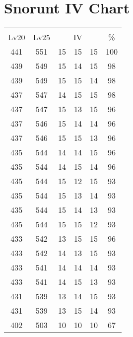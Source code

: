 \documentclass{article}%
\begin{document}
%
\normalsize%
\section{Snorunt IV Chart}%
\label{sec:Snorunt IV Chart}%
\renewcommand{\arraystretch}{1.5}%
\begin{tabular}{|c|c|c|c|c|c|}%
\hline%
\multicolumn{6}{|c|}{\textcolor{white}{ 
\linebreak{Snorunt}
}%
\cellcolor{black}}\\%
\multicolumn{1}{|c}{Lv20}&\multicolumn{1}{c|}{Lv25}&\multicolumn{3}{c|}{IV}&\multicolumn{1}{|c|}{\%}\\%
\hline%
\rowcolor{color100}%
441&551&15&15&15&100\\%
\hline%
\rowcolor{color98}%
439&549&15&14&15&98\\%
\hline%
\rowcolor{color98}%
439&549&15&15&14&98\\%
\hline%
\rowcolor{color98}%
437&547&14&15&15&98\\%
\hline%
\rowcolor{color96}%
437&547&15&13&15&96\\%
\hline%
\rowcolor{color96}%
437&546&15&14&14&96\\%
\hline%
\rowcolor{color96}%
437&546&15&15&13&96\\%
\hline%
\rowcolor{color96}%
435&544&14&14&15&96\\%
\hline%
\rowcolor{color96}%
435&544&14&15&14&96\\%
\hline%
\rowcolor{color93}%
435&544&15&12&15&93\\%
\hline%
\rowcolor{color93}%
435&544&15&13&14&93\\%
\hline%
\rowcolor{color93}%
435&544&15&14&13&93\\%
\hline%
\rowcolor{color93}%
435&544&15&15&12&93\\%
\hline%
\rowcolor{color96}%
433&542&13&15&15&96\\%
\hline%
\rowcolor{color93}%
433&542&14&13&15&93\\%
\hline%
\rowcolor{color93}%
433&541&14&14&14&93\\%
\hline%
\rowcolor{color93}%
433&541&14&15&13&93\\%
\hline%
\rowcolor{color93}%
431&539&13&14&15&93\\%
\hline%
\rowcolor{color93}%
431&539&13&15&14&93\\%
\hline%
\rowcolor{color91}%
402&503&10&10&10&67\\%
\end{tabular}

%
\end{document}

